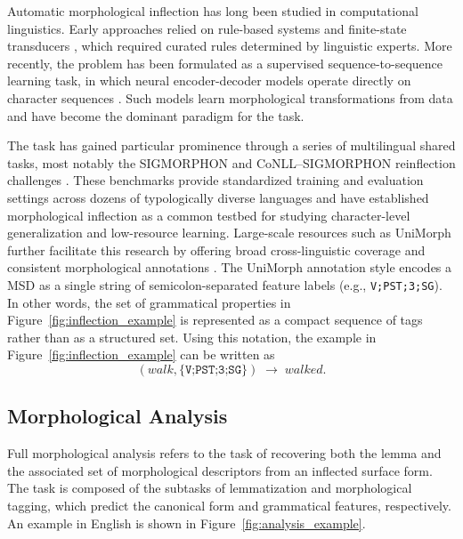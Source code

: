 Automatic morphological inflection has long been studied in computational linguistics. Early approaches relied on rule-based systems and finite-state transducers \parencite{Koskenniemi1983,Kaplan1994, BeesleyKarttunen2003}, which required curated rules determined by linguistic experts. More recently, the problem has been formulated as a supervised sequence-to-sequence learning task, in which neural encoder-decoder models operate directly on character sequences \parencite{faruqui-etal-2016-morphological,kann-schutze-2016-single,aharoni-goldberg-2017-morphological}. Such models learn morphological transformations from data and have become the dominant paradigm for the task.

The task has gained particular prominence through a series of multilingual shared tasks, most notably the SIGMORPHON and CoNLL--SIGMORPHON reinflection challenges \parencite{cotterell-etal-2017-conll, cotterell-etal-2018-conll, goldman-etal-2023-sigmorphon}. These benchmarks provide standardized training and evaluation settings across dozens of typologically diverse languages and have established morphological inflection as a common testbed for studying character-level generalization and low-resource learning. Large-scale resources such as UniMorph further facilitate this research by offering broad cross-linguistic coverage and consistent morphological annotations \parencite{batsuren-etal-2022-unimorph}. The UniMorph annotation style 
encodes a \ac{MSD} as a single string of semicolon-separated feature labels (e.g., \texttt{V;PST;3;SG}). In other words, the set of grammatical properties in Figure~\ref{fig:inflection_example} is represented as a compact sequence of tags rather than as a structured set. Using this notation, the example in Figure~\ref{fig:inflection_example} can be written as
\[
(\textit{walk}, \texttt{\{V;PST;3;SG\}}) \;\rightarrow\; \textit{walked}.
\]

\subsection{Morphological Analysis}

Full morphological analysis refers to the task of recovering both the lemma and the associated set of morphological descriptors from an inflected surface form. The task is composed of the subtasks of lemmatization and morphological tagging, which predict the canonical form and grammatical features, respectively. An example in English is shown in Figure~\ref{fig:analysis_example}.


